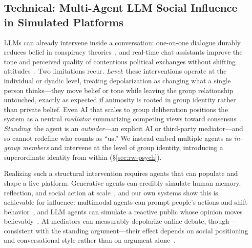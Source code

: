 \subsection{Technical: Multi-Agent LLM Social Influence in Simulated Platforms}
\label{sec:rw-tech}

LLMs can already intervene inside a conversation: one-on-one dialogue durably
reduces belief in conspiracy theories~\cite{costello2024durably}, and real-time chat
assistants improve the tone and perceived quality of contentious political exchanges
without shifting attitudes~\cite{argyle2023chat}. Two limitations recur.
\emph{Level}: these interventions operate at the individual or dyadic level, treating
depolarization as changing what a single person thinks---they move belief or tone
while leaving the group relationship untouched, exactly as expected if animosity is
rooted in group identity rather than private belief. Even AI that scales to group
deliberation positions the system as a neutral \emph{mediator} summarizing competing
views toward consensus~\cite{tessler2024commonground}. \emph{Standing}: the agent is
an \emph{outsider}---an explicit AI or third-party mediator---and so cannot redefine
who counts as ``us.'' We instead embed multiple agents as \emph{in-group members} and
intervene at the level of group identity, introducing a superordinate identity from
within (\S\ref{sec:rw-psych}).

Realizing such a structural intervention requires agents that can populate and shape
a live platform. Generative agents can credibly simulate human memory, reflection,
and social action at scale~\cite{park2023generative}, and our own systems show
this is achievable for influence: multimodal agents can prompt people's actions
and shift behavior~\cite{zhang2025ecoecho}, and LLM agents can simulate a
reactive public whose opinion moves believably~\cite{tang2025breaking}. AI
mediators can measurably depolarize online debate, though---consistent with the
standing argument---their effect depends on social positioning and conversational
style rather than on argument alone~\cite{govers2024aimediators}.

